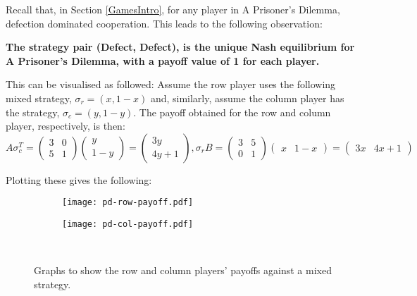 Recall that, in Section \ref{GamesIntro}, for any player in A Prisoner's
Dilemma, defection dominated cooperation. This leads to the following
observation:
\begin{center}
    \textbf{The strategy pair (Defect, Defect), is the unique Nash equilibrium for A Prisoner's Dilemma, with a payoff value of 1 for each player.} \cite{maschler_solan_zamir_2013}
\end{center}
This can be visualised as followed:
Assume the row player uses the following mixed strategy, $\sigma_{r} = (x, 1-x)$
and, similarly, assume the column player has the strategy, $\sigma_{c} = (y,
1-y)$. The payoff obtained for the row and column player, respectively, is then:
\newline
\begin{math}
    A\sigma_{c}^T = \begin{pmatrix}
        3 & 0 \\
        5 & 1
    \end{pmatrix} \begin{pmatrix}
        y \\
        1-y
    \end{pmatrix} = \begin{pmatrix}
        3y \\
        4y + 1
    \end{pmatrix},

    \sigma_{r}B = \begin{pmatrix}
        3 & 5 \\
        0 & 1        
    \end{pmatrix} \begin{pmatrix}
        x & 1-x
    \end{pmatrix} = \begin{pmatrix}
        3x & 4x + 1
    \end{pmatrix}
\end{math}

Plotting these gives the following:

\begin{figure}[h]
    \centering
        \begin{subfigure}[t]{0.45\textwidth}
        \centering
            \texttt{[image: pd-row-payoff.pdf]}
        \end{subfigure}
    \hfill
        \begin{subfigure}[t]{0.45\textwidth}
        \centering
            \texttt{[image: pd-col-payoff.pdf]}
        \end{subfigure}
    ~
    \caption{Graphs to show the row and column players' payoffs against a mixed strategy.}
    \label{MixedStrstegiesPD}
    \end{figure}